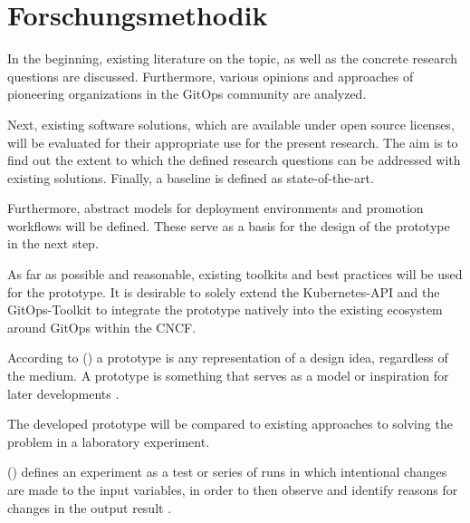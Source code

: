\chapter{Forschungsmethodik}

In the beginning, existing literature on the topic, 
as well as the concrete research questions
are discussed.
Furthermore, various
opinions and approaches of pioneering organizations in the GitOps community are analyzed.
\bigskip

\noindent
Next, existing software solutions,
which are available under open source licenses,
will be evaluated for their appropriate use for the present research.
The aim is to find out the extent to which the defined research questions
can be addressed with existing solutions.
Finally, a baseline is defined as state-of-the-art.
\bigskip

\noindent
Furthermore, abstract models for deployment environments
and promotion workflows will be defined.
These serve as a basis for the design of the prototype in the next step.
\bigskip

\noindent
As far as possible and reasonable, existing toolkits and best practices will be used for the prototype.
It is desirable to solely extend
the Kubernetes-API
and the
GitOps-Toolkit
to integrate the prototype natively into the existing ecosystem around GitOps within the CNCF.
\bigskip

\noindent
According to 
\citeauthor{HOUDE1997367} (\citeyear{HOUDE1997367})
a prototype is any representation of a design idea, regardless of the medium.
A prototype is something that serves as a model or inspiration for later developments
\autocite{HOUDE1997367}.
\bigskip

\noindent
The developed prototype will be compared to existing approaches to solving the problem in a laboratory experiment.
\bigskip

\noindent
\citeauthor{montgomery2017design} (\citeyear{montgomery2017design})
defines an experiment as a test 
or series of runs in which intentional changes are made to the input variables, 
in order to then observe and identify reasons for changes in the output result
\autocite{montgomery2017design}.






